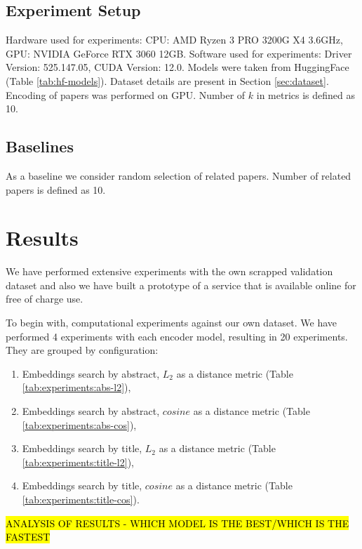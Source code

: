 \documentclass{article}
\begin{document}
    \subsection{Experiment Setup}
        
        Hardware used for experiments: CPU: AMD Ryzen 3 PRO 3200G X4 3.6GHz, GPU: NVIDIA GeForce RTX 3060 12GB. Software used for experiments: Driver Version: 525.147.05, CUDA Version: 12.0.  Models were taken from HuggingFace (Table \ref{tab:hf-models}). Dataset details are present in Section \ref{sec:dataset}. Encoding of papers was performed on GPU. Number of \(k\) in metrics is defined as 10.

    \subsection{Baselines}
        
        As a baseline we consider random selection of related papers. Number of related papers is defined as 10. 

\section{Results}
    We have performed extensive experiments with the own scrapped validation dataset and also we have built a prototype of a service that is available online for free of charge use. 
    
    To begin with, computational experiments against our own dataset. We have performed 4 experiments with each encoder model, resulting in 20 experiments. They are grouped by configuration:
    
    \begin{enumerate}
        \item Embeddings search by abstract, \(L_{2}\) as a distance metric (Table \ref{tab:experiments:abs-l2}),
        \item Embeddings search by abstract, \(cosine\) as a distance metric (Table \ref{tab:experiments:abs-cos}),
        \item Embeddings search by title, \(L_{2}\) as a distance metric (Table \ref{tab:experiments:title-l2}),
        \item Embeddings search by title, \(cosine\) as a distance metric  (Table \ref{tab:experiments:title-cos}).
    \end{enumerate}

    

    \hl{ANALYSIS OF RESULTS - WHICH MODEL IS THE BEST/WHICH IS THE FASTEST}
\end{document}
